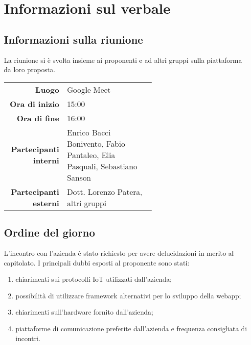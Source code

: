 \section{Informazioni sul verbale}

\subsection{Informazioni sulla riunione}
La riunione si è svolta insieme ai proponenti e ad altri gruppi sulla piattaforma da loro proposta.

\begin{center}
	\begin{tabular}{r|p{0.6\linewidth}}
		\toprule
		\textbf{Luogo} & Google Meet \\
		\textbf{Ora di inizio} & 15:00 \\
		\textbf{Ora di fine} & 16:00 \\
		\textbf{Partecipanti interni} & Enrico Bacci Bonivento, Fabio Pantaleo, Elia Pasquali, Sebastiano Sanson \\
		\textbf{Partecipanti esterni} & Dott. Lorenzo Patera, altri gruppi
	\end{tabular}
\end{center}

\medskip

\subsection{Ordine del giorno}
L'incontro con l'azienda è stato richiesto per avere delucidazioni in merito al capitolato. I principali dubbi esposti al proponente sono stati:
\begin{enumerate}
	\item chiarimenti sui protocolli IoT utilizzati dall'azienda;
	\item possibilità di utilizzare framework alternativi per lo sviluppo della webapp;
	\item chiarimenti sull'hardware fornito dall'azienda;
	\item piattaforme di comunicazione preferite dall'azienda e frequenza consigliata di incontri.
\end{enumerate}

